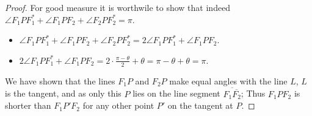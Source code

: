 \documentclass[12pt]{article}
\newcommand{\ds}{\displaystyle}
\theoremstyle{plain}
\begin{document}
\begin{proof}
  For good measure it is worthwile to show that indeed $ \ds \angle F_{1}PF_{1}^{*} + \angle F_{1}PF_{2} + \angle F_{2}PF_{2}^{*} = \pi $.

  \begin{itemize}
    \item  $ \ds \angle F_{1}PF_{1}^{*} + \angle F_{1}PF_{2} + \angle F_{2}PF_{2}^{*} = 2\angle F_{1}PF_{1}^{*} + \angle F_{1}PF_{2} $.
    \item  $ \ds 2\angle F_{1}PF_{1}^{*} + \angle F_{1}PF_{2} = 2 \cdot \frac{\pi - \theta}{2} + \theta = \pi - \theta + \theta = \pi $.
  \end{itemize}

  We have shown that the lines $F_1P$ and $F_2P$ make equal angles with the line $ L $, $ L $ is the tangent, 
  and as only this $ P $ lies on the line segment $ \overline{F_{1}\overline{F_{2}}} $; 
  Thus $F_1PF_2$ is shorter than $F_1P'F_2$ for any other point $P'$ on the tangent at $P$.
\end{proof}
\end{document}
